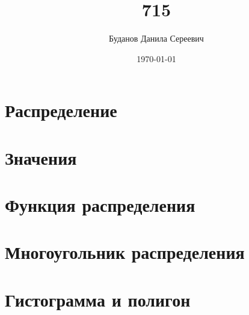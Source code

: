 \documentclass{report}
\begin{document}
\title{715}
\author{Буданов Данила Сереевич}
\date{\today}
\maketitle
\tableofcontents 

\chapter{Распределение}


\chapter{Значения}




\chapter{Функция распределения}
\begin{center}
  
\end{center}
\newpage
\begin{figure}[h]
\center{}
\end{figure}

\chapter{Многоугольник распределения}
\begin{figure}[h]
\center{}
\end{figure}

\chapter{Гистограмма и полигон}
\begin{figure}[h]
\center{}
\end{figure}
\end{document}
